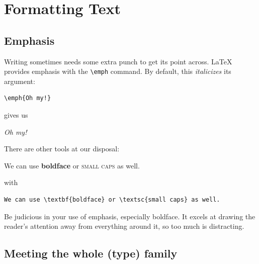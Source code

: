 \chapter{Formatting Text}
\label{formatting}

\section{Emphasis}

Writing sometimes needs some extra punch to get its point across.
\LaTeX{} provides emphasis with the \verb|\emph| command.
By default, this \emph{italicizes} its argument:
\begin{leftfigure}
\begin{lstlisting}
\emph{Oh my!}
\end{lstlisting}
\end{leftfigure}
gives us
\begin{leftfigure}
\lm \emph{Oh my!}
\end{leftfigure}
There are other tools at our disposal:
\begin{leftfigure}
\lm We can use \textbf{boldface} or \textsc{small caps} as well.
\end{leftfigure}
with
\begin{leftfigure}
\begin{lstlisting}
We can use \textbf{boldface} or \textsc{small caps} as well.
\end{lstlisting}
\end{leftfigure}
Be judicious in your use of emphasis, especially boldface.
It excels at drawing the reader's attention away from everything around it,
so too much is distracting.

\section{Meeting the whole (type) family}

